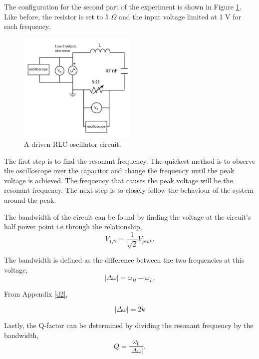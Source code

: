 \documentclass{article}
\begin{document}
The configuration for the second part of the experiment is shown in 
Figure \ref{fig:circuit4}. Like before, the resistor is set to 5 
$\Omega$ and the input voltage limited at 1 V for each frequency.

\begin{figure}[H]
    \centering
    \includegraphics[width=0.5\textwidth]{circuit3.png}
    \caption{A driven RLC oscillator circuit.}
    \label{fig:circuit4}
\end{figure}

The first step is to find the resonant frequency. The quickest 
method is to observe the oscilloscope over the capacitor and 
change the frequency until the peak voltage is achieved. The 
frequency that causes the peak voltage will be the resonant 
frequency. The next step is to closely follow the behaviour of
the system around the peak.

The bandwidth of the circuit can be found by finding the voltage
at the circuit's half power point i.e through the relationship,
\begin{equation}
    V_{1/2} = \frac{1}{\sqrt{2}}V_{peak}.
\end{equation}

The bandwidth is defined as the difference between the two frequencies
at this voltage,
\begin{equation}
    |\Delta\omega| = \omega_H - \omega_L. 
\end{equation}

From Appendix \ref{d2}, 

\begin{equation}
    |\Delta \omega| = 2k
\end{equation}

Lastly, the Q-factor can be determined by dividing the resonant
frequency by the bandwidth,
\begin{equation}
    Q = \frac{\omega_0}{|\Delta\omega|}.
\end{equation}
\end{document}
